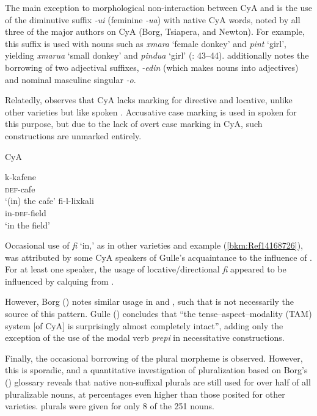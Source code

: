 \documentclass[output=paper]{langsci/langscibook}
\begin{document}
The main exception to morphological non-interaction between CyA and  is the use of the  {diminutive} suffix \textit{{}-ui} (feminine \textit{{}-ua}) with native CyA words, noted by all three of the major authors on CyA (Borg, Tsiapera, and Newton). For example, this suffix is used with  nouns such as \textit{xmara} ‘female donkey’ and \textit{pint} `girl', yielding \textit{xmarua} ‘small donkey’ and \textit{pindua} ‘girl’ (\citealt{Newton1964}: 43–44). \citet{Tsiapera1964} additionally notes the borrowing of two adjectival suffixes, \textit{{}-edin} (which makes nouns into adjectives) and nominal masculine singular \textit{{}-o}.

Relatedly, \citet{Gulle2016} observes that CyA lacks marking for {directive} and {locative}, unlike other  varieties but like spoken . Accusative case marking is used in spoken  for this purpose, but due to the lack of overt case marking in CyA, such constructions are unmarked entirely.

\ea
{CyA}{} {\citealt[44]{Gulle2016}}\\
{\setlength{\multicolsep}{0pt}\begin{multicols}{2}
\ea \gll k-kafene\\
     \textsc{def}-cafe  \\
\glt ‘(in) the cafe’
\ex \gll fi-l-lixkali\\
     in-\textsc{def}-field\\
\glt ‘in the field’\label{bkm:Ref14168726} \label{field}
\z
\end{multicols}}
\z

Occasional use of  \textit{fi} ‘in,’ as in other varieties and example (\ref{bkm:Ref14168726}), was attributed by some CyA speakers of Gulle’s acquaintance to the influence of  . For at least one speaker, the usage of {locative}/directional \textit{fi} appeared to be influenced by {calquing} from .

However, Borg (\citeyear[3]{Borg2004}) notes similar usage in   and , such that  is not necessarily the source of this pattern. Gulle (\citeyear[47]{Gulle2016}) concludes that “the tense--aspect--{modality} (TAM) system [of CyA] is surprisingly almost completely intact”, adding only the exception of the use of the  {modal} verb \textit{prepi} in necessitative constructions.

Finally, the occasional borrowing of the  plural morpheme is observed. However, this is sporadic, and a quantitative investigation of pluralization based on Borg's (\citeyear{Borg2004}) glossary \citep{Walter2017} reveals that native non-suffixal plurals are still used for over half of all pluralizable nouns, at percentages even higher than those posited for other  varieties.  plurals were given for only 8 of the 251 nouns.
\end{document}
